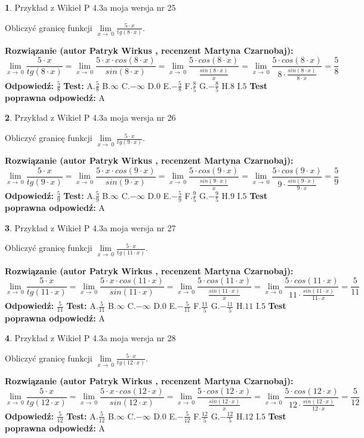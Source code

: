 \documentclass[12pt, a4paper]{article}
\theoremstyle{definition} %
\newtheorem{zad}{}
\newcommand{\zadStart}[1]{\begin{zad}#1\newline}
\newcommand{\zadStop}{\end{zad}}
\newcommand{\rozwStart}[2]{\noindent \textbf{Rozwiązanie (autor #1 , recenzent #2): }\newline}
\newcommand{\rozwStop}{\newline}
\newcommand{\odpStart}{\noindent \textbf{Odpowiedź:}\newline}
\newcommand{\odpStop}{\newline}
\newcommand{\testStart}{\noindent \textbf{Test:}\newline}
\newcommand{\testStop}{\newline}
\newcommand{\kluczStart}{\noindent \textbf{Test poprawna odpowiedź:}\newline}
\newcommand{\kluczStop}{\newline}
\begin{document}
\zadStart{Przykład z Wikieł P 4.3a moja wersja nr 25}


Obliczyć granicę funkcji $\lim\limits_{x\to\ 0}\frac{5 \cdot x}{tg(8 \cdot x)}$.
\zadStop
\rozwStart{Patryk Wirkus}{Martyna Czarnobaj}
$$\lim\limits_{x\to\ 0}\frac{5 \cdot x}{tg(8 \cdot x)}=\lim\limits_{x\to\ 0}\frac{5 \cdot x \cdot cos(8 \cdot x)}{sin(8 \cdot x)}=\lim\limits_{x\to\ 0}\frac{5 \cdot cos(8 \cdot x)}{\frac{sin(8 \cdot x)}{x}}=\lim\limits_{x\to\ 0}\frac{5 \cdot cos(8 \cdot x)}{8 \cdot \frac{sin(8 \cdot x)}{8 \cdot x}} = \frac{5}{8}$$
\rozwStop
\odpStart
$\frac{5}{8}$
\odpStop
\testStart
A.$\frac{5}{8}$
B.$\infty$
C.$-\infty$
D.$0$
E.$-\frac{5}{8}$
F.$\frac{8}{5}$
G.$-\frac{8}{5}$
H.$8$
I.$5$
\testStop
\kluczStart
A
\kluczStop



\zadStart{Przykład z Wikieł P 4.3a moja wersja nr 26}


Obliczyć granicę funkcji $\lim\limits_{x\to\ 0}\frac{5 \cdot x}{tg(9 \cdot x)}$.
\zadStop
\rozwStart{Patryk Wirkus}{Martyna Czarnobaj}
$$\lim\limits_{x\to\ 0}\frac{5 \cdot x}{tg(9 \cdot x)}=\lim\limits_{x\to\ 0}\frac{5 \cdot x \cdot cos(9 \cdot x)}{sin(9 \cdot x)}=\lim\limits_{x\to\ 0}\frac{5 \cdot cos(9 \cdot x)}{\frac{sin(9 \cdot x)}{x}}=\lim\limits_{x\to\ 0}\frac{5 \cdot cos(9 \cdot x)}{9 \cdot \frac{sin(9 \cdot x)}{9 \cdot x}} = \frac{5}{9}$$
\rozwStop
\odpStart
$\frac{5}{9}$
\odpStop
\testStart
A.$\frac{5}{9}$
B.$\infty$
C.$-\infty$
D.$0$
E.$-\frac{5}{9}$
F.$\frac{9}{5}$
G.$-\frac{9}{5}$
H.$9$
I.$5$
\testStop
\kluczStart
A
\kluczStop



\zadStart{Przykład z Wikieł P 4.3a moja wersja nr 27}


Obliczyć granicę funkcji $\lim\limits_{x\to\ 0}\frac{5 \cdot x}{tg(11 \cdot x)}$.
\zadStop
\rozwStart{Patryk Wirkus}{Martyna Czarnobaj}
$$\lim\limits_{x\to\ 0}\frac{5 \cdot x}{tg(11 \cdot x)}=\lim\limits_{x\to\ 0}\frac{5 \cdot x \cdot cos(11 \cdot x)}{sin(11 \cdot x)}=\lim\limits_{x\to\ 0}\frac{5 \cdot cos(11 \cdot x)}{\frac{sin(11 \cdot x)}{x}}=\lim\limits_{x\to\ 0}\frac{5 \cdot cos(11 \cdot x)}{11 \cdot \frac{sin(11 \cdot x)}{11 \cdot x}} = \frac{5}{11}$$
\rozwStop
\odpStart
$\frac{5}{11}$
\odpStop
\testStart
A.$\frac{5}{11}$
B.$\infty$
C.$-\infty$
D.$0$
E.$-\frac{5}{11}$
F.$\frac{11}{5}$
G.$-\frac{11}{5}$
H.$11$
I.$5$
\testStop
\kluczStart
A
\kluczStop



\zadStart{Przykład z Wikieł P 4.3a moja wersja nr 28}


Obliczyć granicę funkcji $\lim\limits_{x\to\ 0}\frac{5 \cdot x}{tg(12 \cdot x)}$.
\zadStop
\rozwStart{Patryk Wirkus}{Martyna Czarnobaj}
$$\lim\limits_{x\to\ 0}\frac{5 \cdot x}{tg(12 \cdot x)}=\lim\limits_{x\to\ 0}\frac{5 \cdot x \cdot cos(12 \cdot x)}{sin(12 \cdot x)}=\lim\limits_{x\to\ 0}\frac{5 \cdot cos(12 \cdot x)}{\frac{sin(12 \cdot x)}{x}}=\lim\limits_{x\to\ 0}\frac{5 \cdot cos(12 \cdot x)}{12 \cdot \frac{sin(12 \cdot x)}{12 \cdot x}} = \frac{5}{12}$$
\rozwStop
\odpStart
$\frac{5}{12}$
\odpStop
\testStart
A.$\frac{5}{12}$
B.$\infty$
C.$-\infty$
D.$0$
E.$-\frac{5}{12}$
F.$\frac{12}{5}$
G.$-\frac{12}{5}$
H.$12$
I.$5$
\testStop
\kluczStart
A
\kluczStop
\end{document}
